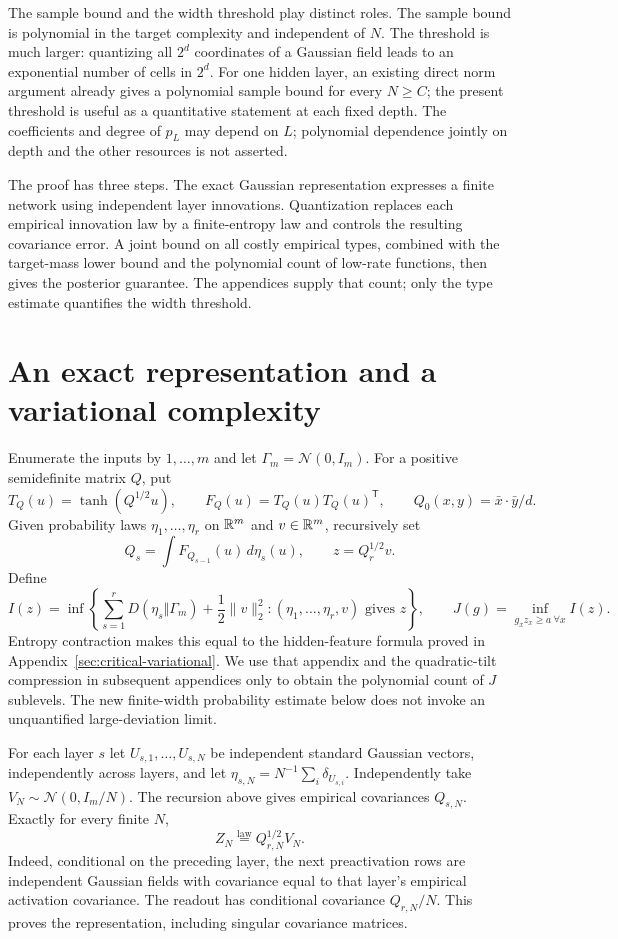 \documentclass[11pt]{article}
\theoremstyle{remark}\newtheorem{remark}[theorem]{Remark}
\begin{document}
The sample bound and the width threshold play distinct roles. The sample
bound is polynomial in the target complexity and independent of $N$.
The threshold is much larger: quantizing all $2^d$ coordinates of a
Gaussian field leads to an exponential number of cells in $2^d$.
For one hidden layer, an existing direct norm argument already gives a
polynomial sample bound for every $N\geq C$; the present threshold is useful
as a quantitative statement at each fixed depth. The coefficients and
degree of $p_L$ may depend on $L$; polynomial dependence jointly on depth
and the other resources is not asserted.

The proof has three steps. The exact Gaussian representation expresses a
finite network using independent layer innovations. Quantization replaces
each empirical innovation law by a finite-entropy law and controls the
resulting covariance error. A joint bound on all costly empirical types,
combined with the target-mass lower bound and the polynomial count of
low-rate functions, then gives the posterior guarantee. The appendices
supply that count; only the type estimate quantifies the width threshold.

\section{An exact representation and a variational complexity}
Enumerate the inputs by $1,\ldots,m$ and let $\Gamma_m=\mathcal N(0,I_m)$.
For a positive semidefinite matrix $Q$, put
\[
 T_Q(u)=\tanh(Q^{1/2}u),\qquad
 F_Q(u)=T_Q(u)T_Q(u)^{\mathsf T},\qquad
 Q_0(x,y)=\bar x\cdot\bar y/d.
\]
Given probability laws $\eta_1,\ldots,\eta_r$ on $\mathbb R^m$ and $v\in\mathbb R^m$,
recursively set
\[
 Q_s=\int F_{Q_{s-1}}(u)\,d\eta_s(u),\qquad z=Q_r^{1/2}v.
\]
Define
\begin{equation}\label{eq:innovation-rate}
 I(z)=\inf\left\{\sum_{s=1}^rD(\eta_s\Vert\Gamma_m)+\frac12\|v\|_2^2:
          (\eta_1,\ldots,\eta_r,v)\text{ gives }z\right\},
 \qquad
 J(g)=\inf_{g_xz_x\geq a\ \forall x}I(z).
\end{equation}
Entropy contraction makes this equal to the hidden-feature formula proved
in Appendix~\ref{sec:critical-variational}. We use that appendix and the
quadratic-tilt compression in subsequent appendices only to obtain the
polynomial count of $J$ sublevels. The new finite-width probability estimate
below does not invoke an unquantified large-deviation limit.

For each layer $s$ let $U_{s,1},\ldots,U_{s,N}$ be independent standard
Gaussian vectors, independently across layers, and let
$\eta_{s,N}=N^{-1}\sum_i\delta_{U_{s,i}}$. Independently take
$V_N\sim\mathcal N(0,I_m/N)$. The recursion above gives empirical
covariances $Q_{s,N}$. Exactly for every finite $N$,
\begin{equation}\label{eq:exact-output}
 Z_N\stackrel{\mathrm{law}}=Q_{r,N}^{1/2}V_N.
\end{equation}
Indeed, conditional on the preceding layer, the next preactivation rows are
independent Gaussian fields with covariance equal to that layer's empirical
activation covariance. The readout has conditional covariance $Q_{r,N}/N$.
This proves the representation, including singular covariance matrices.
\end{document}
